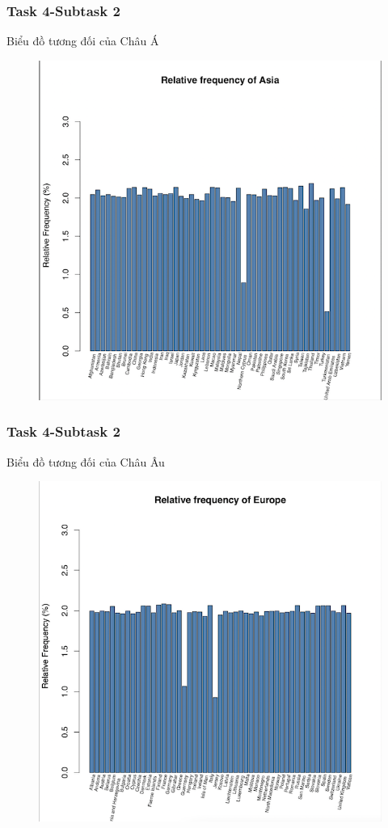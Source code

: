 \documentclass[english,10pt,table]{beamer}
\begin{document}
\frame
{
    \frametitle{Task 4-Subtask 2}
    \begin{block}{Biểu đồ tương đối của Châu Á}
    \begin{figure}
        \centering
        \includegraphics[scale=0.5]{images/4.2.2.png}
    \end{figure}
    \end{block}
}
\frame
{
    \frametitle{Task 4-Subtask 2}
    \begin{block}{Biểu đồ tương đối của Châu Âu}
    \begin{figure}
        \centering
        \includegraphics[scale=0.5]{images/4.2.3.png}
    \end{figure}
    \end{block}
}
\end{document}
